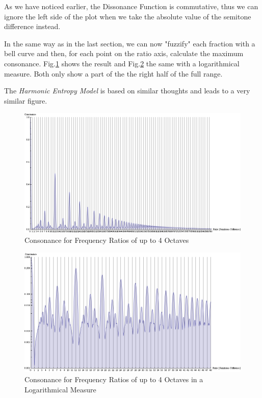 \documentclass[12pt,a4paper,titlepage,oneside]{report}
\begin{document}
As we have noticed earlier, the Dissonance Function is commutative, thus we can ignore the left side of the plot when we take the absolute value of the semitone difference instead.

In the same way as in the last section, we can now "fuzzify" each fraction with a bell curve and then, for each point on the ratio axis, calculate the maximum consonance. Fig.\ref{fig:maxfrac_maxbell} shows the result and Fig.\ref{fig:maxfrac_maxbell_log} the same with a logarithmical measure. Both only show a part of the the right half of the full range.

The \textit{Harmonic Entropy Model} \cite{bib:harmonic_entropy} is based on similar thoughts and leads to a very similar figure.

\begin{figure}[!ht]
\includegraphics[width=\textwidth]{images/maxfrac_maxbell.png}
\centering
\caption{Consonance for Frequency Ratios of up to 4 Octaves}
\label{fig:maxfrac_maxbell}
\end{figure}

\begin{figure}[!ht]
\includegraphics[width=\textwidth]{images/maxfrac_maxbell_log.png}
\centering
\caption{Consonance for Frequency Ratios of up to 4 Octaves in a Logarithmical Measure}
\label{fig:maxfrac_maxbell_log}
\end{figure}
\end{document}
